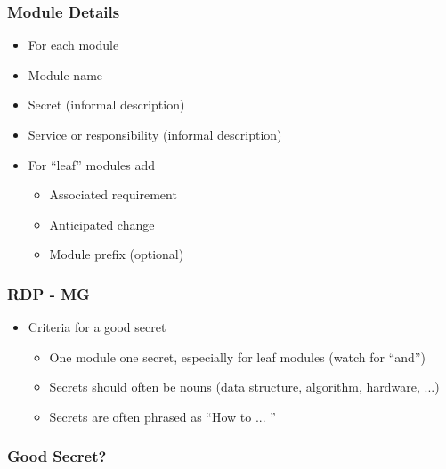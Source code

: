 \documentclass[t,12pt,numbers,fleqn]{beamer}
\begin{document}

\begin{frame}
\frametitle{Module Details}
\begin{itemize}
\item For each module
\item Module name
\item Secret (informal description)
\item Service or responsibility (informal description)
\item For ``leaf'' modules add
\begin{itemize}
\item Associated requirement
\item Anticipated change
\item Module prefix (optional)
\end{itemize}
\end{itemize}
\end{frame}


\begin{frame}
\frametitle{RDP - MG}

\begin{itemize}
\item Criteria for a good secret
\begin{itemize}
\item One module one secret, especially for leaf modules (watch for ``and'')
\item Secrets should often be nouns (data structure, algorithm, hardware, ...)
\item Secrets are often phrased as ``How to ... ''
\end{itemize}
\end{itemize}

\end{frame}


\begin{frame}
\frametitle{Good Secret?}


\end{frame}

\end{document}
